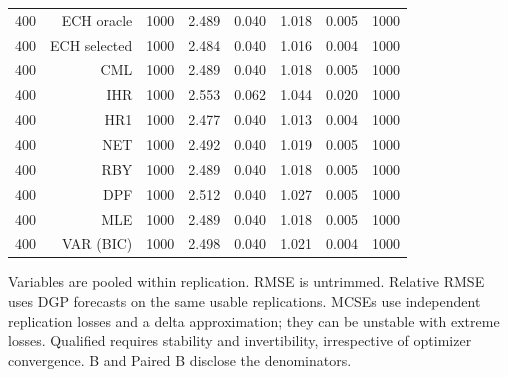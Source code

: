 \begin{table}[p]
\begin{tabular}{rrrrrrrr}
400 & ECH oracle & 1000 & 2.489 & 0.040 & 1.018 & 0.005 & 1000 \\
400 & ECH selected & 1000 & 2.484 & 0.040 & 1.016 & 0.004 & 1000 \\
400 & CML & 1000 & 2.489 & 0.040 & 1.018 & 0.005 & 1000 \\
400 & IHR & 1000 & 2.553 & 0.062 & 1.044 & 0.020 & 1000 \\
400 & HR1 & 1000 & 2.477 & 0.040 & 1.013 & 0.004 & 1000 \\
400 & NET & 1000 & 2.492 & 0.040 & 1.019 & 0.005 & 1000 \\
400 & RBY & 1000 & 2.489 & 0.040 & 1.018 & 0.005 & 1000 \\
400 & DPF & 1000 & 2.512 & 0.040 & 1.027 & 0.005 & 1000 \\
400 & MLE & 1000 & 2.489 & 0.040 & 1.018 & 0.005 & 1000 \\
400 & VAR (BIC) & 1000 & 2.498 & 0.040 & 1.021 & 0.004 & 1000 \\
\bottomrule\end{tabular}
\par\medskip
\begin{minipage}{0.98\linewidth}\footnotesize Variables are pooled within replication. RMSE is untrimmed. Relative RMSE uses DGP forecasts on the same usable replications. MCSEs use independent replication losses and a delta approximation; they can be unstable with extreme losses. Qualified requires stability and invertibility, irrespective of optimizer convergence. B and Paired B disclose the denominators.\end{minipage}
\end{table}
